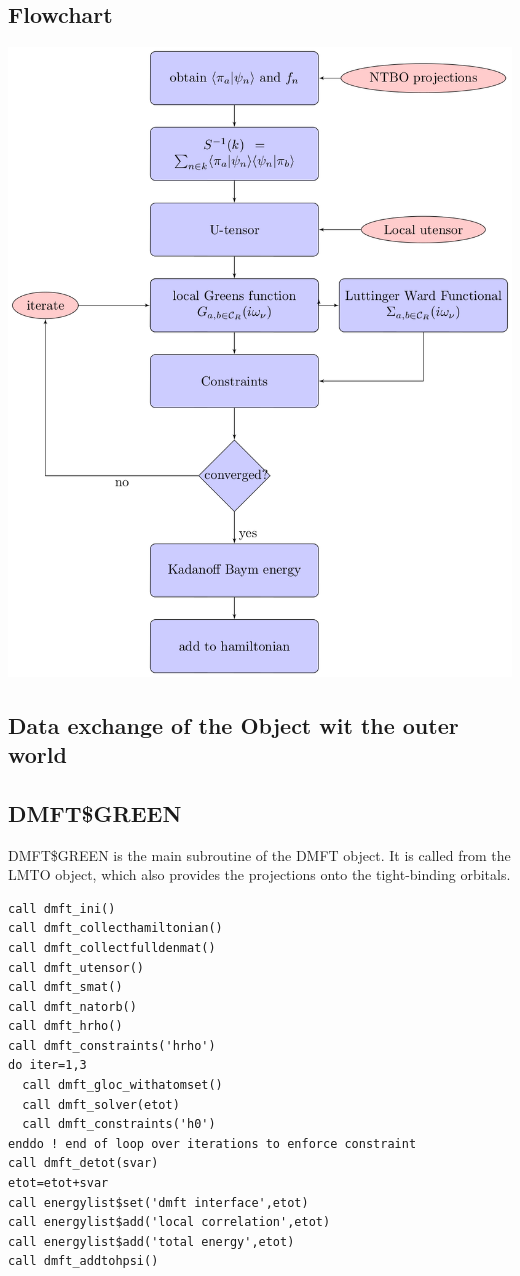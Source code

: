 \documentclass[11pt,a4paper]{report}
\begin{document}
\subsection{Flowchart}
\begin{center}
\includegraphics[width=0.5\linewidth]
{Figs/TikZ/FlowdiagramDMFTinterface/flow.eps}
\end{center}

\subsection{Data exchange of the Object wit the outer world}


\subsection{DMFT\$GREEN}
DMFT\$GREEN is the main subroutine of the DMFT object. It is called
from the LMTO object, which also provides the  projections onto the
tight-binding orbitals.

\begin{verbatim}
call dmft_ini()
call dmft_collecthamiltonian()  
call dmft_collectfulldenmat()  
call dmft_utensor() 
call dmft_smat()
call dmft_natorb()
call dmft_hrho()
call dmft_constraints('hrho')
do iter=1,3
  call dmft_gloc_withatomset() 
  call dmft_solver(etot) 
  call dmft_constraints('h0')
enddo ! end of loop over iterations to enforce constraint
call dmft_detot(svar)
etot=etot+svar      
call energylist$set('dmft interface',etot)
call energylist$add('local correlation',etot)
call energylist$add('total energy',etot)
call dmft_addtohpsi()
\end{verbatim}
\end{document}

